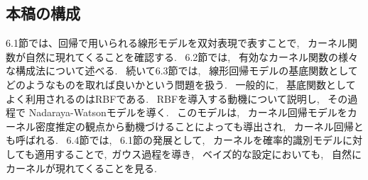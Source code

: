 \documentclass[11pt,a4paper]{jreport}
\begin{document}
\subsection*{本稿の構成}
6.1節では、回帰で用いられる線形モデルを双対表現で表すことで,~ カーネル関数が自然に現れてくることを確認する.~ 6.2節では,~ 有効なカーネル関数の様々な構成法について述べる.~ 続いて6.3節では,~ 線形回帰モデルの基底関数としてどのようなものを取れば良いかという問題を扱う.~ 一般的に,~ 基底関数としてよく利用されるのはRBFである.~ RBFを導入する動機について説明し,~ その過程で Nadaraya-Watsonモデルを導く.~ このモデルは,~ カーネル回帰モデルをカーネル密度推定の観点から動機づけることによっても導出され,~ カーネル回帰とも呼ばれる.~ 6.4節では,~ 6.1節の発展として,~ カーネルを確率的識別モデルに対しても適用することで,~ガウス過程を導き,~ ベイズ的な設定においても,~ 自然にカーネルが現れてくることを見る.~
\end{document}
